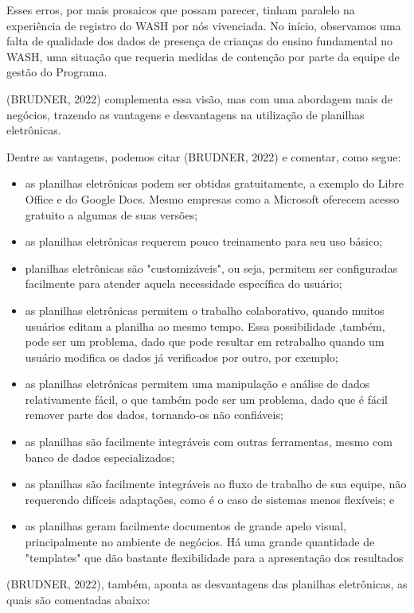 Esses erros, por mais prosaicos que possam parecer, tinham paralelo na experiência de registro do WASH por nós vivenciada. No início, observamos uma falta de qualidade dos dados de presença de crianças do ensino fundamental no WASH, uma situação que requeria medidas de contenção por parte da equipe de gestão do Programa.

(BRUDNER, 2022) complementa essa visão, mas com uma abordagem mais de negócios, trazendo as vantagens e desvantagens na utilização de planilhas eletrônicas.

Dentre as vantagens, podemos citar (BRUDNER, 2022) e comentar, como segue:


\begin{itemize}
\item as planilhas eletrônicas podem ser obtidas gratuitamente, a exemplo do Libre Office e do Google Docs. Mesmo empresas como a Microsoft oferecem acesso gratuito a algumas de suas versões;
\item as planilhas eletrônicas requerem pouco treinamento para seu uso básico;
\item planilhas eletrônicas são "customizáveis", ou seja, permitem ser configuradas facilmente para atender aquela necessidade específica do usuário;
\item as planilhas eletrônicas permitem o trabalho colaborativo, quando muitos usuários editam a planilha ao mesmo tempo. Essa possibilidade ,também, pode ser um problema, dado que pode resultar em retrabalho quando um usuário modifica os dados já verificados por outro, por exemplo;
\item as planilhas eletrônicas permitem uma manipulação e análise de dados relativamente fácil, o que também pode ser um problema, dado que é fácil remover parte dos dados, tornando-os não confiáveis;
\item as planilhas são facilmente integráveis com outras ferramentas, mesmo com banco de dados especializados;
\item as planilhas são facilmente integráveis ao fluxo de trabalho de sua equipe, não requerendo difíceis adaptações, como é o caso de sistemas menos flexíveis; e
\item as planilhas geram facilmente documentos de grande apelo visual, principalmente no ambiente de negócios. Há uma grande quantidade de "templates" que dão bastante flexibilidade para a apresentação dos resultados
\end{itemize}

(BRUDNER, 2022), também, aponta as desvantagens das planilhas eletrônicas, as quais são comentadas abaixo:


